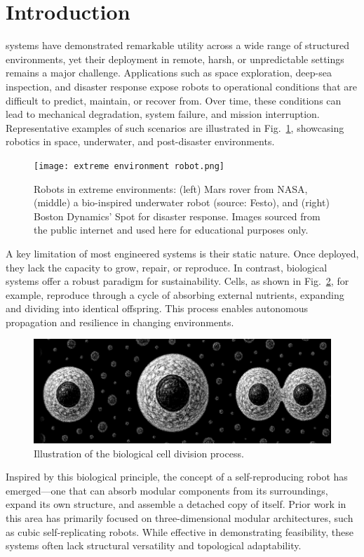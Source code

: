\documentclass[lettersize,journal]{IEEEtran}
\begin{document}
\section{Introduction}
 systems have demonstrated remarkable utility across a wide range of structured environments, yet their deployment in remote, harsh, or unpredictable settings remains a major challenge. Applications such as space exploration\cite{you2025construction}, deep-sea inspection\cite{An_Overview_of_Robotics_and_Autonomous_Systems_for_Harsh_Environments}, and disaster response expose robots to operational conditions that are difficult to predict, maintain, or recover from. Over time, these conditions can lead to mechanical degradation, system failure, and mission interruption. Representative examples of such scenarios are illustrated in Fig.~\ref{fig:robotic_scenarios}, showcasing robotics in space, underwater, and post-disaster environments.
\begin{figure}[H]
    \centering
    \texttt{[image: extreme environment robot.png]}
    \caption{Robots in extreme environments: (left) Mars rover from NASA, (middle) a bio-inspired underwater robot (source: Festo), and (right) Boston Dynamics' Spot for disaster response. Images sourced from the public internet and used here for educational purposes only.}
    \label{fig:robotic_scenarios}
\end{figure}

A key limitation of most engineered systems is their static nature. Once deployed, they lack the capacity to grow, repair, or reproduce\cite{4141032}. In contrast, biological systems offer a robust paradigm for sustainability. Cells, as shown in Fig.~\ref{cell division}, for example, reproduce through a cycle of absorbing external nutrients, expanding and dividing into identical offspring\cite{XU2016516}. This process enables autonomous propagation and resilience in changing environments.
\begin{figure}
    \centering
    \includegraphics[width=0.85\linewidth]{cell division.png}
    \caption{Illustration of the biological cell division process.}
    \label{cell division}
\end{figure}
Inspired by this biological principle\cite{doi:10.1073/pnas.1017075108}, the concept of a self-reproducing robot has emerged—one that can absorb modular components from its surroundings, expand its own structure, and assemble a detached copy of itself. Prior work in this area has primarily focused on three-dimensional modular architectures\cite{AbdelRahman2022}, such as cubic self-replicating robots\cite{zykoy2005self}. While effective in demonstrating feasibility, these systems often lack structural versatility and topological adaptability.
\end{document}

